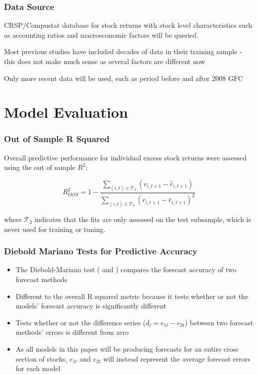 \documentclass[]{beamer}
\begin{document}
\begin{frame}
\frametitle{Data Source}
CRSP/Compustat database for stock returns with stock level characteristics such as accounting ratios and macroeconomic factors will be queried.

Most previous studies have included decades of data in their training sample - this does not make much sense as several factors are different now

Only more recent data will be used, such as period before and after 2008 GFC
\end{frame}

\section{Model Evaluation}

\begin{frame}
\frametitle{Out of Sample R Squared}
Overall predictive performance for individual excess stock returns were assessed using the out of sample $R^2$:

\begin{equation}
R^2_{OOS} = 
	1 - 
	\frac{\sum_{(i, t)\in\mathcal{T}_3}(r_{i, t+1} - \widehat{r}_{i, t+1})}
	{\sum_{(i, t)\in\mathcal{T}_3} \left( r_{i, t+1} - \bar{r}_{i, t+1} \right) ^2}
\end{equation}

where $\mathcal{T}_3$ indicates that the fits are only assessed on the test subsample, which is never used for training or tuning. 
\end{frame}

\begin{frame}
\frametitle{Diebold Mariano Tests for Predictive Accuracy}
\begin{itemize}
	\item The Diebold-Mariano test (\cite{diebold_comparing_2002} and \cite{harvey_testing_1997}) compares the forecast accuracy of two forecast methods
	
	\item Different to the overall R squared metric because it tests whether or not the models' forecast accuracy is significantly different
	
	\item Tests whether or not the difference series ($d_t = e_{1t} - e_{2t}$) between two forecast methods' errors is different from zero
	
	\item As all models in this paper will be producing forecasts for an entire cross section of stocks, $e_{1t}$ and $e_{2t}$ will instead represent the average forecast errors for each model
\end{itemize}
\end{frame}
\end{document}
